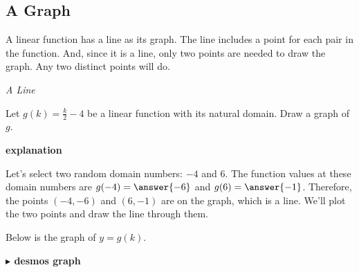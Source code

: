 \documentclass{ximera}
\begin{document}
\subsection*{A Graph}




A linear function has a line as its graph.  The line includes a point for each pair in the function.  And, since it is a line, only two points are needed to draw the graph.  Any two distinct points will do.





\begin{example} \textit{A Line}


Let $g(k) = \frac{k}{2} - 4$ be a linear function with its natural domain. Draw a graph of $g$.


\textbf{\textcolor{red!75!green}{explanation}} 


Let's select two random domain numbers: $-4$ and $6$.  The function values at these domain numbers are $g(-4) = \answer{-6}$ and $g(6) = \answer{-1}$.  Therefore, the points $(-4, -6)$ and $(6, -1)$ are on the graph, which is a line.  We'll plot the two points and draw the line through them.


Below is the graph of $y=g(k)$.


\begin{image}
\end{image}






\textbf{\textcolor{blue!55!black}{$\blacktriangleright$ desmos graph}} 
\begin{center}
\end{center}







\end{example}
\end{document}
